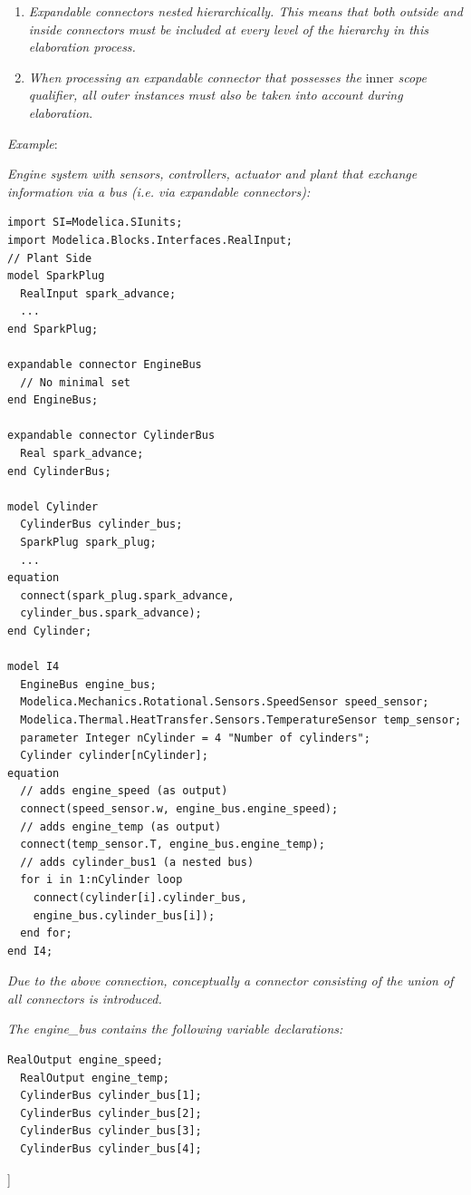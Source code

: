 \documentclass[10pt,a4paper]{report}
\begin{document}
\begin{enumerate}
\item \emph{Expandable connectors nested hierarchically. This means that
both outside and inside connectors must be included at every level of
the hierarchy in this elaboration process.}
\item \emph{When processing an expandable connector that possesses the}
inner \emph{scope qualifier, all outer instances must also be taken into
account during elaboration}.
\end{enumerate}
\emph{Example}:

\emph{Engine system with sensors, controllers, actuator and plant that
exchange information via a bus (i.e. via expandable connectors):}
\begin{lstlisting}[language=modelica]
import SI=Modelica.SIunits;
import Modelica.Blocks.Interfaces.RealInput;
// Plant Side
model SparkPlug
  RealInput spark_advance;
  ...
end SparkPlug;

expandable connector EngineBus
  // No minimal set
end EngineBus;

expandable connector CylinderBus
  Real spark_advance;
end CylinderBus;

model Cylinder
  CylinderBus cylinder_bus;
  SparkPlug spark_plug;
  ...
equation
  connect(spark_plug.spark_advance,
  cylinder_bus.spark_advance);
end Cylinder;

model I4
  EngineBus engine_bus;
  Modelica.Mechanics.Rotational.Sensors.SpeedSensor speed_sensor;
  Modelica.Thermal.HeatTransfer.Sensors.TemperatureSensor temp_sensor;
  parameter Integer nCylinder = 4 "Number of cylinders";
  Cylinder cylinder[nCylinder];
equation
  // adds engine_speed (as output)
  connect(speed_sensor.w, engine_bus.engine_speed);
  // adds engine_temp (as output)
  connect(temp_sensor.T, engine_bus.engine_temp);
  // adds cylinder_bus1 (a nested bus)
  for i in 1:nCylinder loop
    connect(cylinder[i].cylinder_bus,
    engine_bus.cylinder_bus[i]);
  end for;
end I4;
\end{lstlisting}
\emph{Due to the above connection, conceptually a connector consisting
of the union of all connectors is introduced.}

\emph{The engine\_bus contains the following variable declarations:}
\begin{lstlisting}[language=modelica]
  RealOutput engine_speed;
  RealOutput engine_temp;
  CylinderBus cylinder_bus[1];
  CylinderBus cylinder_bus[2];
  CylinderBus cylinder_bus[3];
  CylinderBus cylinder_bus[4];
\end{lstlisting}
{]}
\end{document}
